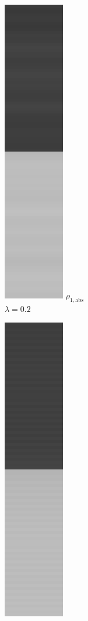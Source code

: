 \documentclass[onecolumn,final,a4paper,13pt,reqno]{siamart}
\begin{document}
\begin{figure}[t]
\begin{subfigure}[t]{0.08\textwidth}
	\end{subfigure}
	\begin{subfigure}[t]{0.08\textwidth}
		\includegraphics[scale=0.3]{pictures/denoising/signal/ipiano_absolute_02.png}
		\scriptsize $\rho_{1,\text{abs}}$\\[2px]
		\scriptsize $\lambda = 0.2$
	\end{subfigure}
	\begin{subfigure}[t]{0.08\textwidth}
		\includegraphics[scale=0.3]{pictures/denoising/signal/ipiano_squared_02.png}

\end{subfigure}
\end{figure}
\end{document}
